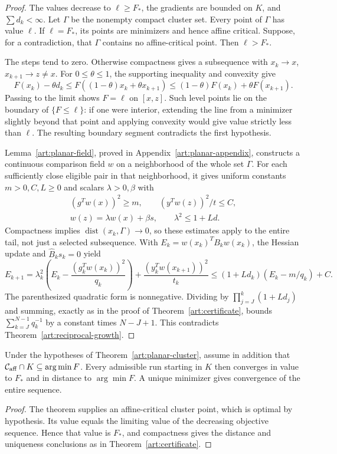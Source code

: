 \begin{proof}
The values decrease to $\ell\ge F_*$, the gradients are bounded on $K$, and
$\sum d_k<\infty$. Let $\Gamma$ be the nonempty compact cluster set.
Every point of $\Gamma$ has value $\ell$. If $\ell=F_*$, its points are
minimizers and hence affine critical. Suppose, for a contradiction, that
$\Gamma$ contains no affine-critical point. Then $\ell>F_*$.

The steps tend to zero. Otherwise compactness gives a subsequence with
$x_k\to x$, $x_{k+1}\to z\ne x$. For $0\le\theta\le1$, the supporting
inequality and convexity give
\[
 F(x_k)-\theta d_k
 \le F((1-\theta)x_k+\theta x_{k+1})
 \le(1-\theta)F(x_k)+\theta F(x_{k+1}).
\]
Passing to the limit shows $F=\ell$ on $[x,z]$. Such level points lie on
the boundary of $\{F\le\ell\}$: if one were interior, extending the line
from a minimizer slightly beyond that point and applying convexity would
give value strictly less than $\ell$. The resulting boundary segment
contradicts the first hypothesis.

Lemma~\ref{art:planar-field}, proved in Appendix~\ref{art:planar-appendix},
constructs a continuous comparison field $w$ on a neighborhood of the whole
set $\Gamma$. For each sufficiently close eligible pair in that neighborhood,
it gives uniform constants $m>0,C,L\ge0$ and scalars $\lambda>0,\beta$ with
\[
 \begin{gathered}
 (g^Tw(x))^2\ge m,\qquad (y^Tw(z))^2/t\le C,\\
 w(z)=\lambda w(x)+\beta s,\qquad \lambda^2\le1+Ld.
 \end{gathered}
\]
Compactness implies $\operatorname{dist}(x_k,\Gamma)\to0$, so these estimates
apply to the entire tail, not just a selected subsequence.
With $E_k=w(x_k)^TB_kw(x_k)$, the Hessian update and $\widehat B_ks_k=0$ yield
\[
 E_{k+1}=
 \lambda_k^2\left(E_k-\frac{(g_k^Tw(x_k))^2}{q_k}\right)
       +\frac{(y_k^Tw(x_{k+1}))^2}{t_k}
 \le(1+Ld_k)(E_k-m/q_k)+C.
\]
The parenthesized quadratic form is nonnegative. Dividing by
$\prod_{j=J}^{k}(1+Ld_j)$ and summing, exactly as in the proof of
Theorem~\ref{art:certificate}, bounds $\sum_{k=J}^{N-1}q_k^{-1}$ by a constant
times $N-J+1$. This contradicts Theorem~\ref{art:reciprocal-growth}.
\end{proof}

\begin{corollary}\label{art:planar-convergence}
Under the hypotheses of Theorem~\ref{art:planar-cluster}, assume in addition
that $\mathcal C_{\rm aff}\cap K\subseteq\arg\min F$. Every admissible run
starting in $K$ then converges in value to $F_*$ and in distance to
$\arg\min F$. A unique minimizer gives convergence of the entire sequence.
\end{corollary}
\begin{proof}
The theorem supplies an affine-critical cluster point, which is optimal by
hypothesis. Its value equals the limiting value of the decreasing objective
sequence. Hence that value is $F_*$, and compactness gives the distance and
uniqueness conclusions as in Theorem~\ref{art:certificate}.
\end{proof}

